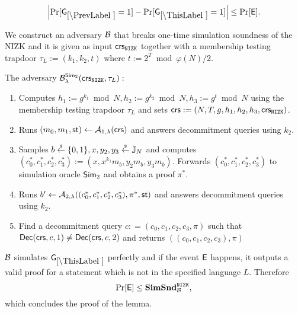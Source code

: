 \[
\left|\Pr[\games_\prevgame = 1] - \Pr[\games_\thisgame = 1]\right| \leq \Pr[\event]. 
\]

We construct an adversary $\mathcal{B}$ that breaks one-time simulation soundness of the NIZK and it is given as input $\mathsf{crs}_{\mathtt{NIZK}}$ together with a membership testing trapdoor $\tau_L:=(k_1, k_2, t)$ where $t:=2^T \bmod \varphi(N)/2$. 

The adversary $\mathcal{B}_{\lambda}^{\mathsf{Sim}_2}(\mathsf{crs}_{\mathtt{NIZK}}, \tau_L):$
\vspace{-2mm}
\begin{enumerate}
\item Computes $h_1:= g^{k_1} \bmod N, h_2:= g^{k_2} \bmod N, h_3:= g^{t} \bmod N$ using the membership testing trapdoor $\tau_L$ and sets $\mathsf{crs}:=(N, T, g, h_1, h_2, h_3, \mathsf{crs}_{\mathtt{NIZK}})$.
\item Runs $(m_0, m_1, \mathsf{st}) \leftarrow \mathcal{A}_{1, \lambda}(\mathsf{crs})$ and answers decommitment queries using $k_2$.
\item Samples $b \stackrel{{\scriptscriptstyle\$}}{\leftarrow} \{0,1\}, x, y_2, y_3 \stackrel{{\scriptscriptstyle\$}}{\leftarrow} \mathbb{J}_N$ and computes $(c_0^*, c_1^*, c_2^*, c_3^*):=(x, x^{k_1} m_b,\allowbreak y_2 m_b, y_3 m_b)$. Forwards $(c_0^*, c_1^*, c_2^*, c_3^*)$ to simulation oracle $\mathsf{Sim}_2$ and obtains a proof $\pi^*$.
\item Runs $b' \leftarrow \mathcal{A}_{2, \lambda}((c_0^*, c_1^*, c_2^*, c_3^*), \pi^*, \mathsf{st})$ and answers decommitment queries using $k_2$.
\item Find a decommitment query $c: = (c_0, c_1, c_2, c_3, \pi)$ such that $\mathsf{Dec}(\mathsf{crs}, c, 1) \neq \mathsf{Dec}(\mathsf{crs},c,2)$ and returns $((c_0, c_1, c_2, c_3), \pi)$
\end{enumerate}

$\mathcal{B}$ simulates $\games_\thisgame$ perfectly and if the event $\mathsf{E}$ happens, it outputs a valid proof for a statement which is not in the specified language $L$. Therefore
\[\Pr[\mathsf{E}] \leq \mathbf{SimSnd}^{\mathtt{NIZK}}_{\mathcal{B}},\]
which concludes the proof of the lemma.  

%
%
%

